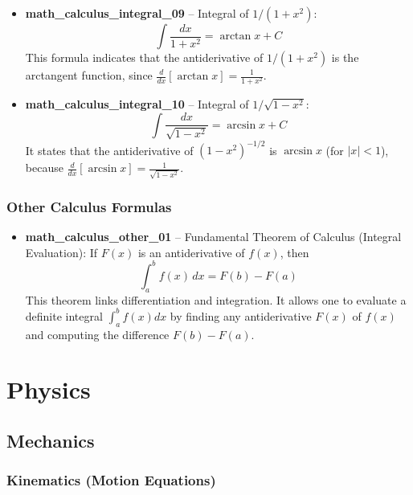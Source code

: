 \documentclass[11pt,a4paper]{article}
\begin{document}
\begin{itemize}
\item \textbf{math\_calculus\_integral\_09} -- Integral of $1/(1+x^2)$: 
\[\int \frac{dx}{1+x^2} = \arctan x + C\]
This formula indicates that the antiderivative of $1/(1+x^2)$ is the arctangent function, since $\frac{d}{dx}[\arctan x] = \frac{1}{1+x^2}$.

\item \textbf{math\_calculus\_integral\_10} -- Integral of $1/\sqrt{1-x^2}$: 
\[\int \frac{dx}{\sqrt{1-x^2}} = \arcsin x + C\]
It states that the antiderivative of $(1-x^2)^{-1/2}$ is $\arcsin x$ (for $|x|<1$), because $\frac{d}{dx}[\arcsin x] = \frac{1}{\sqrt{1-x^2}}$.
\end{itemize}

\subsubsection{Other Calculus Formulas}

\begin{itemize}
\item \textbf{math\_calculus\_other\_01} -- Fundamental Theorem of Calculus (Integral Evaluation): 
If $F(x)$ is an antiderivative of $f(x)$, then
\[\int_{a}^{b} f(x)\,dx = F(b) - F(a)\]
This theorem links differentiation and integration. It allows one to evaluate a definite integral $\int_a^b f(x)dx$ by finding any antiderivative $F(x)$ of $f(x)$ and computing the difference $F(b)-F(a)$.
\end{itemize}

\section{Physics}

\subsection{Mechanics}

\subsubsection{Kinematics (Motion Equations)}
\end{document}
